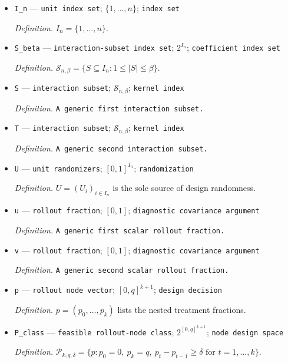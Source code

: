 \documentclass{article}
\begin{document}
\begin{itemize}
  \par\smallskip\noindent\emph{Definition.} \texttt{The nominal error probability for the finite-\allowbreak{}sample Chebyshev confidence set.}
  \item \texttt{I\_\allowbreak{}n} --- \texttt{unit index set}; \(\{1,\ldots,n\}\); \texttt{index set}
  \par\smallskip\noindent\emph{Definition.} \(I_n=\{1,\ldots,n\}\).
  \item \texttt{S\_\allowbreak{}beta} --- \texttt{interaction-\allowbreak{}subset index set}; \(2^{I_n}\); \texttt{coefficient index set}
  \par\smallskip\noindent\emph{Definition.} \(\mathcal S_{n,\beta}=\{S\subseteq I_n:1\le |S|\le\beta\}\).
  \item \texttt{S} --- \texttt{interaction subset}; \(\mathcal S_{n,\beta}\); \texttt{kernel index}
  \par\smallskip\noindent\emph{Definition.} \texttt{A generic first interaction subset.}
  \item \texttt{T} --- \texttt{interaction subset}; \(\mathcal S_{n,\beta}\); \texttt{kernel index}
  \par\smallskip\noindent\emph{Definition.} \texttt{A generic second interaction subset.}
  \item \texttt{U} --- \texttt{unit randomizers}; \([0,1]^{I_n}\); \texttt{randomization}
  \par\smallskip\noindent\emph{Definition.} \(U=(U_i)_{i\in I_n}\) is the sole source of design randomness.
  \item \texttt{u} --- \texttt{rollout fraction}; \([0,1]\); \texttt{diagnostic covariance argument}
  \par\smallskip\noindent\emph{Definition.} \texttt{A generic first scalar rollout fraction.}
  \item \texttt{v} --- \texttt{rollout fraction}; \([0,1]\); \texttt{diagnostic covariance argument}
  \par\smallskip\noindent\emph{Definition.} \texttt{A generic second scalar rollout fraction.}
  \item \texttt{p} --- \texttt{rollout node vector}; \([0,q]^{k+1}\); \texttt{design decision}
  \par\smallskip\noindent\emph{Definition.} \(p=(p_0,\ldots,p_k)\) lists the nested treatment fractions.
  \item \texttt{P\_\allowbreak{}class} --- \texttt{feasible rollout-\allowbreak{}node class}; \(2^{[0,q]^{k+1}}\); \texttt{node design space}
  \par\smallskip\noindent\emph{Definition.} \(\mathcal P_{k,q,\delta}=\{p:p_0=0,\ p_k=q,\ p_t-p_{t-1}\ge\delta\text{ for }t=1,\ldots,k\}\).

\end{itemize}
\end{document}
